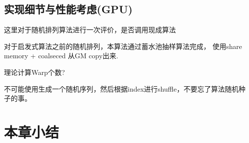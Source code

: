 \subsection{实现细节与性能考虑(GPU)}
\label{cha:chap04:Heuristic:Skill}

这里对于随机排列算法进行一次评价，是否调用现成算法

对于启发式算法之前的随机排列，本算法通过蓄水池抽样算法完成，
使用share memory + coalseced 从GM copy出来.

理论计算Warp个数?

不可能使用生成一个随机序列，然后根据index进行shuffle，不要忘了算法随机种子的事。


\section{本章小结}






